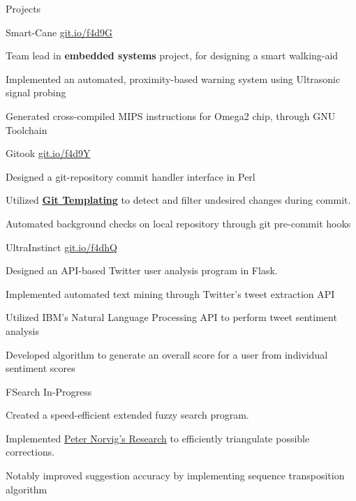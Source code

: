 \documentclass{resume} %
\begin{document}

\begin{rSection}{Projects}

  \begin{rProjectSection}{Smart-Cane}
                         {{\href{https://git.io/f4d9G}{git.io/f4d9G}}}
  \item Team lead in \textbf{embedded systems} project, for designing a smart 
  walking-aid
  \item Implemented an automated, proximity-based warning system using
  Ultrasonic signal probing
  \item Generated cross-compiled MIPS instructions for Omega2 chip, 
  through GNU Toolchain
  \end{rProjectSection}

  \begin{rProjectSection}{Gitook}
                         {{\href{https://git.io/f4d9Y}{git.io/f4d9Y}}}
  \item Designed a git-repository commit handler interface in Perl
  \item Utilized {\href{https://git-template.readthedocs.io/en/latest/}{\textbf{Git Templating}}} to detect and filter undesired
  changes during commit.
  \item Automated background checks on local repository through 
  git pre-commit hooks
  \end{rProjectSection}

  \begin{rProjectSection}{UltraInstinct}
                         {{\href{https://git.io/f4dhQ}{git.io/f4dhQ}}}
  \item Designed an API-based Twitter user analysis program in Flask.
  \item Implemented automated text mining through Twitter's tweet 
  extraction API
  \item Utilized IBM's Natural Language Processing API to perform tweet sentiment analysis
  \item Developed algorithm to generate an overall score for a user from
  individual sentiment scores

  \end{rProjectSection}

  \begin{rProjectSection}{FSearch}
                         {In-Progress}
  \item Created a speed-efficient extended fuzzy search program.
	\item Implemented \href{http://norvig.com/mayzner.html}{\underline{Peter Norvig's Research}} to efficiently triangulate possible corrections.
	\item Notably improved suggestion accuracy by implementing sequence 
  transposition algorithm
  \end{rProjectSection}

\end{rSection}
\end{document}
